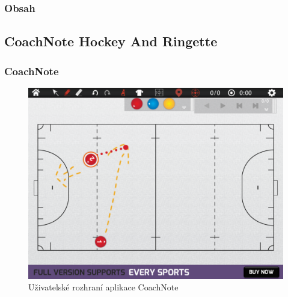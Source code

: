 \documentclass{beamer}
\begin{document}
\begin{frame}
  \frametitle{Obsah}
  \tableofcontents[currentsection]
\end{frame}

\subsection{CoachNote Hockey And Ringette}

\begin{frame}
\frametitle{CoachNote}

  \begin{figure}[H]
    \includegraphics[width=.8\textwidth]{img/IMG_0011}
    \caption{Uživatelské rozhraní aplikace CoachNote}
    \label{pic:coachnote}
  \end{figure}

\end{frame}
\end{document}
